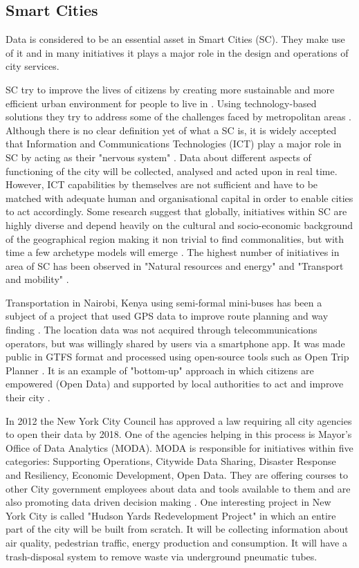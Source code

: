 		\subsection{Smart Cities}
Data is considered to be an essential asset in Smart Cities (SC). They make use of it and in many initiatives it plays a major role in the design and operations of city services.

SC try to improve the lives of citizens by creating more sustainable and more efficient urban environment for people to live in \citep{geertman2015planning}. Using technology-based solutions they try to address some of the challenges faced by metropolitan areas \citep{Neirotti2014}. Although there is no clear definition yet of what a SC is, it is widely accepted that Information and Communications Technologies (ICT) play a major role in SC by acting as their "nervous system" \citep{Neirotti2014, geertman2015planning}. Data about different aspects of functioning of the city will be collected, analysed and acted upon in real time. However, ICT capabilities by themselves are not sufficient and have to be matched with adequate human and organisational capital in order to enable cities to act accordingly.  Some research suggest that globally, initiatives within SC are highly diverse and depend heavily on the cultural and socio-economic background of the geographical region making it non trivial to find commonalities, but with time a few archetype models will emerge \citep{Neirotti2014, geertman2015planning}. The highest number of initiatives in area of SC has been observed in "Natural resources and energy" and "Transport and mobility" \citep{Neirotti2014}.

Transportation in Nairobi, Kenya using semi-formal mini-buses has been a subject of a project that used GPS data to improve route planning and way finding \citep{klopp2015leveraging}. The location data was not acquired through telecommunications operators, but was willingly shared by users via a smartphone app. It was made public in GTFS format and processed using open-source tools such as Open Trip Planner \citep{klopp2015leveraging}. It is an example of "bottom-up" approach in which citizens are empowered (Open Data) and supported by local authorities to act and improve their city \citep{Neirotti2014}.

In 2012 the New York City Council has approved a law requiring all city agencies to open their data by 2018. One of the agencies helping in this process is Mayor's Office of Data Analytics (MODA). MODA is responsible for initiatives within five categories: Supporting Operations, Citywide Data Sharing, Disaster Response and Resiliency, Economic Development, Open Data. They are offering courses to other City government employees about data and tools available to them and are also promoting data driven decision making \citep{NYCMODA2014}. One interesting project in New York City is called "Hudson Yards Redevelopment Project" in which an entire part of the city will be built from scratch. It will be collecting information about air quality, pedestrian traffic, energy production and consumption. It will have a trash-disposal system to remove waste via underground pneumatic tubes.

